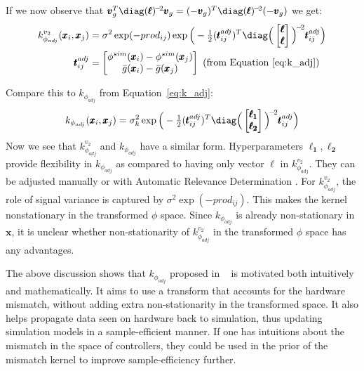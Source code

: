If we now observe that $\pmb{v}_{g}^T\diag(\pmb{\ell})^{\!-\!2} \pmb{v}_{g} = (-\pmb{v}_{g})^T\diag(\pmb{\ell})^{\!-\!2} (-\pmb{v}_{g})$ we get:
\begin{align*}
k^{v_2}_{\phi_{adj}}(\pmb{x}_i, \pmb{x}_j) 
&= \sigma^2 \exp(-prod_{ij}) \exp\Big(- \tfrac{1}{2} (\pmb{t}_{ij}^{adj})^T \diag\Big(\begin{bmatrix}\pmb{\ell} \\ \pmb{\ell} \end{bmatrix} \Big)^{\!-\!2} \pmb{t}_{ij}^{adj} \Big) \\
\pmb{t}_{ij}^{adj} &= 
\begin{bmatrix}
\phi^{sim}(\pmb{x}_{i}) - \phi^{sim}(\pmb{x}_{j}) \\
\bar{g}(\pmb{x}_i) - \bar{g}(\pmb{x}_j)
\end{bmatrix} \text{ (from Equation~\ref{eq:k_adj})}
\end{align*}

Compare this to $k_{\phi_{adj}}$ from Equation~\ref{eq:k_adj}:
\begin{equation}
k_{\phi_{adj}}(\pmb{x}_i, \pmb{x}_j) = \sigma_k^2 \exp\Big(- \tfrac{1}{2} (\pmb{t}_{ij}^{adj})^T \diag\Big(\begin{bmatrix}\pmb{\ell_1} \\ \pmb{\ell_2} \end{bmatrix}\Big)^{\!-\!2} \pmb{t}_{ij}^{adj} \Big)
\end{equation}
Now we see that $k^{v_2}_{\phi_{adj}}$ and $k_{\phi_{adj}}$ have a similar form. Hyperparameters $\pmb{\ell_1}, \pmb{\ell_2}$ provide flexibility in $k_{\phi_{adj}}$ as compared to having only vector $\pmb{\ell}$ in $k^{v_2}_{\phi_{adj}}$. They can be adjusted manually or with Automatic Relevance Determination \citep{GPsMLBook}. 
For $k^{v_2}_{\phi_{adj}}$, the role of signal variance is captured by $\sigma^2 \exp(-prod_{ij})$. This makes the kernel nonstationary in the transformed $\phi$ space. 
Since $k_{\phi_{adj}}$ is already non-stationary in $\pmb{x}$, it is  unclear whether non-stationarity of $k^{v_2}_{\phi_{adj}}$ in the transformed $\phi$ space has any advantages.

The above discussion shows that $k_{\phi_{adj}}$ proposed in ~\cite{rai2017bayesian} is motivated both intuitively and mathematically. It aims to use a transform that accounts for the hardware mismatch, without adding extra non-stationarity in the transformed space. It also helps propagate data seen on hardware back to simulation, thus updating simulation models in a sample-efficient manner. If one has intuitions about the mismatch in the space of controllers, they could be used in the prior of the mismatch kernel to improve sample-efficiency further. 

